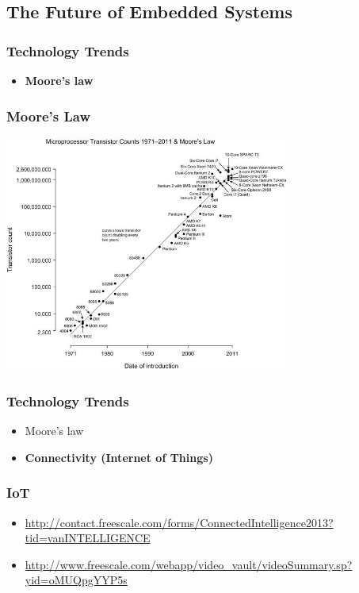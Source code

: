 \subsection[Attribute]{The Future of Embedded Systems}

\begin{frame}
  \frametitle{Technology Trends}
  \begin{itemize}
    \item {\bf Moore's law}
  \end{itemize}
\end{frame}

\begin{frame}
  \frametitle{Moore's Law}
  \begin{center}
    \includegraphics[width=0.7\textwidth]{slides/te5009-future-of-embedded-systems/moore-law.jpg}
  \end{center}
\end{frame}

\begin{frame}
  \frametitle{Technology Trends}
  \begin{itemize}
    \item Moore's law
    \item {\bf Connectivity (Internet of Things)}
  \end{itemize}
\end{frame}

\begin{frame}
  \frametitle{IoT}
  \begin{itemize}
    \item \footnotesize
      \url{http://contact.freescale.com/forms/ConnectedIntelligence2013?tid=vanINTELLIGENCE}
      \normalsize
    \item \footnotesize
      \url{http://www.freescale.com/webapp/video_vault/videoSummary.sp?yid=oMUQpgYYP5s}
      \normalsize
  \end{itemize}
\end{frame}

